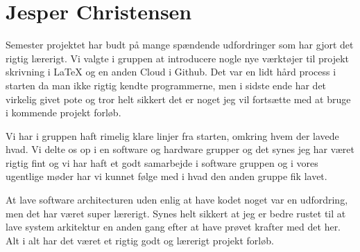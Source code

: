 \section{Jesper Christensen}

Semester projektet har budt på mange spændende udfordringer som har gjort det rigtig lærerigt. Vi valgte i gruppen at introducere nogle nye værktøjer til projekt skrivning i LaTeX og en anden Cloud i Github. Det var en lidt hård process i starten da man ikke rigtig kendte programmerne, men i sidste ende har det virkelig givet pote og tror helt sikkert det er noget jeg vil fortsætte med at bruge i kommende projekt forløb.

Vi har i gruppen haft rimelig klare linjer fra starten, omkring hvem der lavede hvad. Vi delte os op i en software og hardware grupper og det synes jeg har været rigtig fint og vi har haft et godt samarbejde i software gruppen og i vores ugentlige møder har vi kunnet følge med i hvad den anden gruppe fik lavet.

At lave software architecturen uden enlig at have kodet noget var en udfordring, men det har været super lærerigt. Synes helt sikkert at jeg er bedre rustet til at lave system arkitektur en anden gang efter at have prøvet krafter med det her. Alt i alt har det været et rigtig godt og lærerigt projekt forløb.